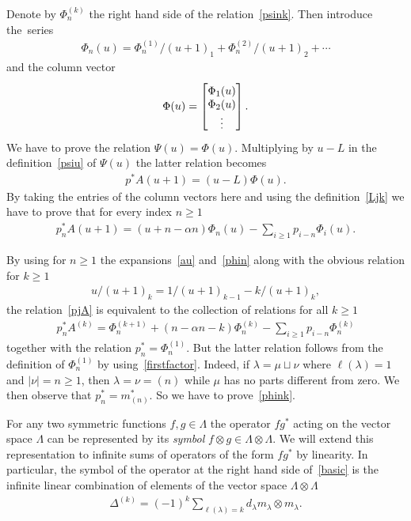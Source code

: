 \documentclass[11pt]{article}
\numberwithin{equation}{section}
\renewcommand\ge{\geqslant}
\begin{document}
Denote by $\Phi^{(k)}_n$ the right hand side of the relation~\eqref{psink}.
Then introduce the~series
\begin{gather}
\label{phin}
\Phi_n(u)=\Phi^{(1)}_n/(u+1)_1+\Phi^{(2)}_n/
(u+1)_2+\cdots
\end{gather}
and the column vector
\begin{gather*}
\Phi(u)=
\begin{bmatrix}
\raisebox{0pt}[12pt][0pt]{$\Phi_1(u)$}
\\
\Phi_2(u)
\\
\vdots
\end{bmatrix}
.
\end{gather*}
We have to prove the relation $\Psi(u)=\Phi(u)$.
Multiplying by $u-L$ in the def\/inition~\eqref{psiu} of $\Psi(u)$ the latter relation becomes
\begin{gather*}
p^{\ast}A(u+1)=(u-L)\Phi(u).
\end{gather*}
By taking the entries of the column vectors here and using the def\/inition~\eqref{Ljk} we have to prove
that for every index $n\ge1$
\begin{gather}
\label{pjA}
p^{\ast}_nA(u+1)=(u+n-\alpha n)\Phi_n(u)-\sum_{i\ge1}
p_{i-n}\Phi_i(u).
\end{gather}

By using for $n\ge1$ the expansions~\eqref{au} and~\eqref{phin} along with the obvious relation for $k\ge1$
\begin{gather*}
u/(u+1)_k=1/(u+1)_{k-1}-k/(u+1)_k,
\end{gather*}
the relation~\eqref{pjA} is equivalent to the collection of relations for all $k\ge1$
\begin{gather}
\label{phink}
p^{\ast}_nA^{(k)}=\Phi^{(k+1)}_n+(
n-\alpha n-k)\Phi^{(k)}_n-\sum_{i\ge1}
p_{i-n}\Phi^{(k)}_n
\end{gather}
together with the relation $p^{\ast}_n=\Phi^{(1)}_n$.
But the latter relation follows from the def\/inition of $\Phi^{(1)}_n$ by
using~\eqref{firstfactor}.
Indeed, if $\lambda=\mu\sqcup\nu$ where $\ell(\lambda)=1$ and $|\nu|=n\ge1$, then $\lambda=\nu=(n)$ while
$\mu$ has no parts dif\/ferent from zero.
We then observe that $p_n^{\ast}=m_{(n)}^{\ast}$.
So we have to prove~\eqref{phink}.

For any two symmetric functions $f,g\in\Lambda$ the operator $f g^{\ast}$
acting on the vector space $\Lambda$ can be represented by its \emph{symbol} $f\otimes
g\in\Lambda\otimes\Lambda$.
We will extend this representation to inf\/inite sums of operators of the form $f
g^{\ast}$ by linearity.
In particular, the symbol of the operator at the right hand side of~\eqref{basic} is the inf\/inite linear
combination of elements of the vector space $\Lambda\otimes\Lambda$
\begin{gather}
\label{dek}
\Delta^{(k)}=(-1)^k\sum_{\ell(\lambda)=k}d_\lambda m_\lambda\otimes m_\lambda.
\end{gather}
\end{document}
